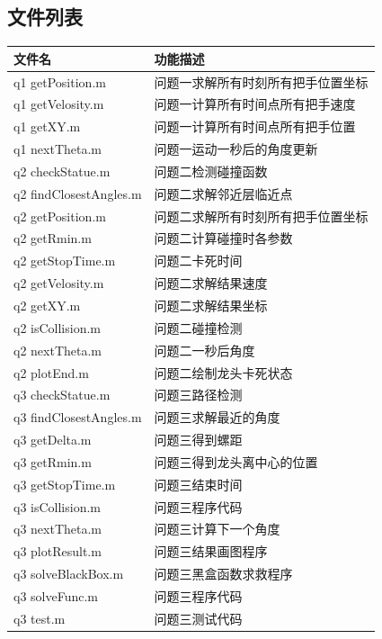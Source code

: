 \documentclass[withoutpreface,bwprint]{cumcmthesis}
\begin{document}
\begin{appendices}
\section{文件列表}
\begin{table}[H]
\centering
\begin{tabularx}{\textwidth}{LL}
\toprule
文件名   & 功能描述 \\
\midrule
q1 getPosition.m & 问题一求解所有时刻所有把手位置坐标 \\
q1 getVelosity.m & 问题一计算所有时间点所有把手速度 \\
q1 getXY.m & 问题一计算所有时间点所有把手位置 \\
q1 nextTheta.m & 问题一运动一秒后的角度更新 \\

q2 checkStatue.m & 问题二检测碰撞函数 \\
q2 findClosestAngles.m & 问题二求解邻近层临近点 \\
q2 getPosition.m & 问题二求解所有时刻所有把手位置坐标 \\
q2 getRmin.m & 问题二计算碰撞时各参数 \\
q2 getStopTime.m & 问题二卡死时间 \\
q2 getVelosity.m & 问题二求解结果速度 \\
q2 getXY.m & 问题二求解结果坐标 \\
q2 isCollision.m & 问题二碰撞检测 \\
q2 nextTheta.m & 问题二一秒后角度 \\
q2 plotEnd.m & 问题二绘制龙头卡死状态 \\


q3 checkStatue.m & 问题三路径检测 \\
q3 findClosestAngles.m & 问题三求解最近的角度 \\
q3 getDelta.m & 问题三得到螺距 \\
q3 getRmin.m & 问题三得到龙头离中心的位置 \\
q3 getStopTime.m & 问题三结束时间 \\
q3 isCollision.m & 问题三程序代码 \\
q3 nextTheta.m & 问题三计算下一个角度 \\
q3 plotResult.m & 问题三结果画图程序 \\
q3 solveBlackBox.m & 问题三黑盒函数求救程序 \\
q3 solveFunc.m & 问题三程序代码 \\
q3 test.m & 问题三测试代码 \\


\end{tabularx}
\end{table}
\end{appendices}
\end{document}
